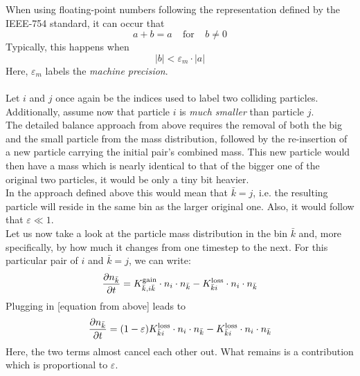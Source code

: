         When using floating-point numbers following the representation defined
        by the IEEE-754 standard, it can occur that
        \begin{equation}
          a+b=a
          \ \ \ \ \ \text{for} \ \ \ \ \
          b\neq0
        \end{equation}
        Typically, this happens when
        \begin{equation}
            |b|<\varepsilon_m\cdot|a|
        \end{equation}
        Here, $\varepsilon_m$ labels the \textit{machine precision}.\\
        \\
        
        Let $i$ and $j$ once again be the indices used to label two colliding particles. Additionally, 
        assume now that particle $i$ is \textit{much smaller} than particle $j$.\\
        
        The detailed balance approach from above requires the removal of both the big and the small 
        particle from the mass distribution, followed by the re-insertion of a new particle carrying the 
        initial pair's combined mass. This new particle would then have a mass which is nearly identical 
        to that of the bigger one of the original two particles, it would be only a tiny bit heavier.\\
        
        In the approach defined above this would mean that $\bar k=j$, i.e. the resulting particle will 
        reside in the same bin as the larger original one. Also, it would follow that 
        $\varepsilon\ll1$.\\
        
        Let us now take a look at the particle mass distribution in the bin $\bar k$ and, more 
        specifically, by how much it changes from one timestep to the next. For this particular pair of 
        $i$ and $\bar k=j$, we can write:
        \begin{equation}
            \frac{\partial n_{\bar k}}{\partial t}
                =K_{\bar k,i\bar k}^{\text{gain}}\cdot n_i\cdot n_{\bar k}
                -K_{\bar ki}^{\text{loss}}\cdot n_i\cdot n_{\bar k}
        \end{equation}
        Plugging in [equation from above] leads to
        \begin{equation}
            \frac{\partial n_{\bar k}}{\partial t}
                =(1-\varepsilon)K_{\bar ki}^{\text{loss}}\cdot n_i\cdot n_{\bar k}
                -K_{\bar ki}^{\text{loss}}\cdot n_i\cdot n_{\bar k}
        \end{equation}
        Here, the two terms almost cancel each other out. What remains is a contribution which is 
        proportional to $\varepsilon$.\\
        
